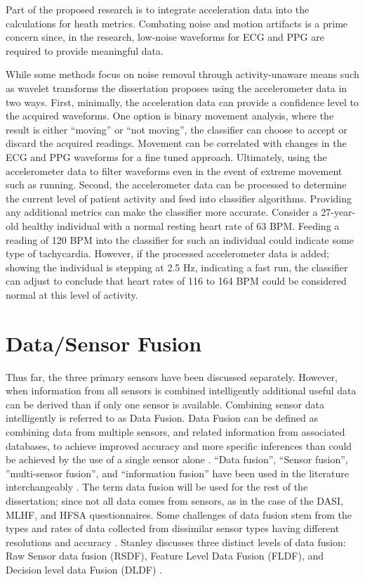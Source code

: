 Part of the proposed research is to integrate acceleration data into the calculations for heath metrics. Combating noise and motion artifacts is a prime concern since, in the research, low-noise waveforms for ECG and PPG are required to provide meaningful data.

While some methods focus on noise removal through activity-unaware means such as wavelet transforms \cite{Liu2011} the dissertation proposes using the accelerometer data in two ways. First, minimally, the acceleration data can provide a confidence level to the acquired waveforms. One option is binary movement analysis, where the result is either “moving” or “not moving”, the classifier can choose to accept or discard the acquired readings. Movement can be correlated with changes in the ECG and PPG waveforms for a fine tuned approach. Ultimately, using the accelerometer data to filter waveforms even in the event of extreme movement such as running. Second, the accelerometer data can be processed to determine the current level of patient activity and feed into classifier algorithms. Providing any additional metrics can make the classifier more accurate. Consider a 27-year-old healthy individual with a normal resting heart rate of 63 BPM. Feeding a reading of 120 BPM into the classifier for such an individual could indicate some type of tachycardia. However, if the processed accelerometer data is added; showing the individual is stepping at 2.5 Hz, indicating a fast run, the classifier can adjust to conclude that heart rates of 116 to 164 BPM could be considered normal at this level of activity.

\section{Data/Sensor Fusion}
\label{sec:DataFusion}
Thus far, the three primary sensors have been discussed separately. However, when information from all sensors is combined intelligently additional useful data can be derived than if only one sensor is available.  Combining sensor data intelligently is referred to as Data Fusion. Data Fusion can be defined as combining data from multiple sensors, and related information from associated databases, to achieve improved accuracy and more specific inferences than could be achieved by the use of a single sensor alone \cite{Hall1997}.  “Data fusion”, “Sensor fusion”,  ”multi-sensor fusion”, and “information fusion” have been used in the literature interchangeably \cite{Crowley1993} \cite{Ceruti2006} \cite{Dantu2006} \cite{Dong2006} \cite{Durrant-Whyte2005} \cite{Qi2001} \cite{Stanley2007} \cite{Wu2002}. The term data fusion will be used for the rest of the dissertation; since not all data comes from sensors, as in the case of the DASI, MLHF, and HFSA questionnaires.  Some challenges of data fusion stem from the types and rates of data collected from dissimilar sensor types having different resolutions and accuracy \cite{Wu2002}.  Stanley discusses three distinct levels of data fusion: Raw Sensor data fusion (RSDF), Feature Level Data Fusion (FLDF), and Decision level data Fusion (DLDF) \cite{Stanley2007}.  


